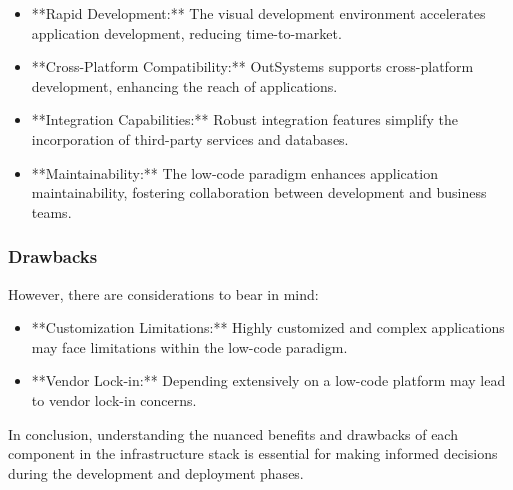     \begin{itemize}
        \item **Rapid Development:** The visual development environment accelerates application development, reducing time-to-market.
        \item **Cross-Platform Compatibility:** OutSystems supports cross-platform development, enhancing the reach of applications.
        \item **Integration Capabilities:** Robust integration features simplify the incorporation of third-party services and databases.
        \item **Maintainability:** The low-code paradigm enhances application maintainability, fostering collaboration between development and business teams.
    \end{itemize}
    
    \subsubsection{Drawbacks}
    However, there are considerations to bear in mind:
    
    \begin{itemize}
        \item **Customization Limitations:** Highly customized and complex applications may face limitations within the low-code paradigm.
        \item **Vendor Lock-in:** Depending extensively on a low-code platform may lead to vendor lock-in concerns.
    \end{itemize}
    
    In conclusion, understanding the nuanced benefits and drawbacks of each component in the infrastructure stack is essential for making informed decisions during the development and deployment phases.